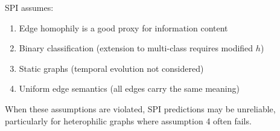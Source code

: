 \begin{remark}
SPI assumes:
\begin{enumerate}
\item Edge homophily is a good proxy for information content
\item Binary classification (extension to multi-class requires modified $h$)
\item Static graphs (temporal evolution not considered)
\item Uniform edge semantics (all edges carry the same meaning)
\end{enumerate}

When these assumptions are violated, SPI predictions may be unreliable, particularly for heterophilic graphs where assumption 4 often fails.
\end{remark}

